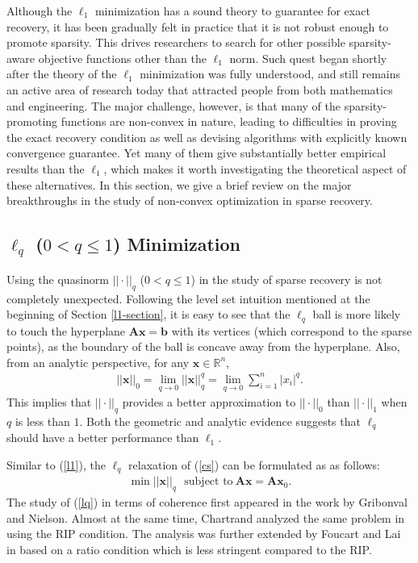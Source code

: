 \documentclass[11pt]{article}
\numberwithin{equation}{section}
\theoremstyle{plain}
\theoremstyle{definition}
\def\R{{\mathbb R}}
\def\R{{\mathbb R}}
\def\A{{\mathbf A}}
\def\x{{\mathbf x}}
\def\b{{\mathbf b}}
\begin{document}
Although the $\ell_1$ minimization has a sound theory to guarantee for exact recovery, it has been gradually felt in practice that it is not robust enough to promote sparsity. This drives researchers to search for other possible sparsity-aware objective functions other than the $\ell_1$ norm. Such quest began shortly after the theory of the $\ell_1$ minimization was fully understood, and still remains an active area of research today that attracted people from both mathematics and engineering. The major challenge, however, is that many of the sparsity-promoting functions are non-convex in nature, leading to difficulties in proving the exact recovery condition as well as devising algorithms with explicitly known convergence guarantee. Yet many of them give substantially better empirical results than the $\ell_1$, which makes it worth investigating the theoretical aspect of these alternatives. In this section, we give a brief review on the major breakthroughs in the study of non-convex optimization in sparse recovery. 

\subsection{$\ell_q$ ($0<q\leq 1$) Minimization }

Using the quasinorm $|| \cdot||_q$ ($0<q\leq 1$) in the study of sparse recovery is not completely unexpected. Following the level set intuition mentioned at the beginning of Section \ref{l1-section}, it is easy to see that the $\ell_q$ ball is more likely to touch the hyperplane $\A\x=\b$ with its vertices (which correspond to the sparse points), as the boundary of the ball is concave away from the hyperplane. Also, from an analytic perspective, for any $\x\in\R^n$, 
\begin{align*}
||\x||_0 = \lim_{q\rightarrow 0}||\x||^q_q=\lim_{q\rightarrow 0}\sum_{i=1}^n|x_i|^q. 
\end{align*}
This implies that $|| \cdot||_q$ provides a better approximation to $|| \cdot||_0$ than $|| \cdot||_1$ when $q$ is less than $1$. Both the geometric and analytic evidence suggests that $\ell_q$ should have a better performance than $\ell_1$. 

Similar to (\ref{l1}), the $\ell_q$ relaxation of (\ref{cs}) can be formulated as as follows:
\begin{align}
\min ||\x||_q \ \ \ \text{subject to}\ \A\x=\A\x_0.\label{lq}
\end{align}
The study of (\ref{lq}) in terms of coherence first appeared in the work \cite{gribonval2007highly} by Gribonval and Nielson. Almost at the same time, Chartrand analyzed the same problem in \cite{chartrand2007exact} using the RIP condition. The analysis was further extended  by Foucart and Lai in \cite{foucart2009sparsest} based on a ratio condition which is less stringent compared to the RIP.   
\end{document}
